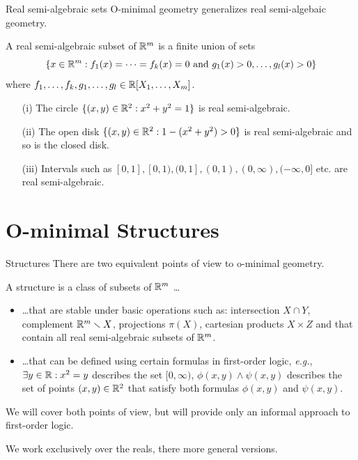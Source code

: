 \documentclass{beamer}
\begin{document}
\begin{frame}{Real semi-algebraic sets} 
  O-minimal geometry generalizes real semi-algebaic geometry. 

  \begin{definition}
    A \alert{real semi-algebraic} subset of ${\mathbb{R}}^m$ is a finite union
    of sets    
    \begin{equation*}
      \{x\in{\mathbb{R}}^m :f_1(x) =\cdots = f_k(x) = 0 \text{ and }
      g_1(x)>0,\ldots,g_l(x)>0\}
    \end{equation*}
    where $f_1,\ldots,f_k,g_1,\ldots,g_l\in {\mathbb{R}}[X_1,\ldots,X_m]$.
  \end{definition}

  \begin{example}
    \begin{enumerate}
    \item [(i)] The circle $\{(x,y)\in{\mathbb{R}}^2: x^2+y^2=1\}$ is
      real semi-algebraic.
    \item[(ii)] The open disk $\{(x,y) \in{\mathbb{R}}^2 : 1-(x^2+y^2)>0\}$ is
      real semi-algebraic and so is the closed disk.
    \item[(iii)] Intervals such as
      $[0,1],[0,1),(0,1],(0,1),(0,\infty),(-\infty,0]$ etc. are real
      semi-algebraic. 
    \end{enumerate}
  \end{example}
\end{frame}

\section{O-minimal Structures}

\begin{frame}{Structures}
  There are two equivalent
  points of view to o-minimal geometry.

  A \alert{structure} is a class of
    subsets of ${\mathbb{R}}^m$ \ldots
  \begin{itemize}
  \item \ldots  that are stable under basic operations
    such as: \alert{intersection} $X\cap Y$, \alert{complement}
    ${\mathbb{R}}^m\smallsetminus X$,
    \alert{projections} $\pi(X)$, \alert{cartesian products} $X\times
    Z$ and that contain all real semi-algebraic subsets of ${\mathbb{R}}^m$.

  \item \ldots that can be defined using certain formulas in
    first-order
    logic, \textit{e.g.}, 
    $\exists y\in {\mathbb{R}} : x^2=y$ describes the set $[0,\infty)$,
    $\phi(x,y)\wedge \psi(x,y)$ describes the set of points
    $(x,y)\in{\mathbb{R}}^2$ that satisfy both formulas $\phi(x,y)$ and
    $\psi(x,y)$. 
  \end{itemize}
  We will cover both points of view, but will provide only an informal
  approach to first-order logic.
  
  We work exclusively
  over the reals,  there more general versions.
\end{frame}
\end{document}
